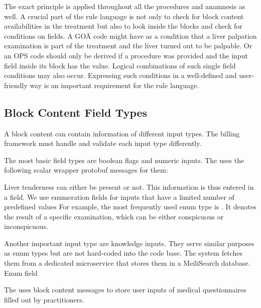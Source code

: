 

The exact principle is applied throughout all the procedures and anamnesis as well.
A crucial part of the rule language is not only to check for block content availabilities in the treatment
but also to look inside the blocks and check for conditions on fields.
A GOÄ code might have as a condition that a liver palpation examination is part of the treatment and
the liver turned out to be palpable.
Or an OPS code should only be derived if a procedure was provided and the
input field inside its block has the value.
Logical combinations of such single field conditions may also occur.
Expressing such conditions in a well-defined and user-friendly way is an important requirement for the rule language.

\subsection{Block Content Field Types}
A block content can contain information of different input types.
The billing framework must handle and validate each input type differently.

The most basic field types are boolean flags and numeric inputs.
The \AVS uses the following scalar wrapper protobuf messages for them:



Liver tenderness can either be present or not.
This information is thus entered in a \code{BoolW]} field.
We use enumeration fields for inputs that have a limited number of predefined values
For example, the most frequently used enum type is .
It denotes the result of a specific examination, which can be either conspicuous or inconspicuous.



Another important input type are knowledge inputs.
They serve similar purposes as enum types but are not hard-coded into the code base.
The system fetches them from a dedicated microservice that stores them in a MeiliSearch database.
Enum field


The \AVS uses block content messages to store user inputs of medical questionnaires filled out by practitioners.

